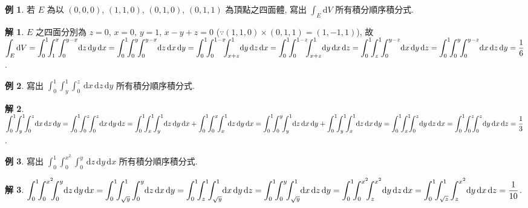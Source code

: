 \documentclass[12pt]{extarticle}
\newcommand{\ds}{\displaystyle}
\theoremstyle{definition}
\newtheorem*{ex}{例}
\newtheorem*{sol}{解}
\begin{document}
{\begin{ex}
  若 $E$ 為以 $(0, 0, 0)$, $(1, 1, 0)$, $(0, 1, 0)$, $(0, 1, 1)$ 為頂點之四面體, 寫出 $\ds\int_E\text{d}V$ 所有積分順序積分式.
\end{ex}

\begin{sol}
  $E$ 之四面分別為 $z = 0$, $x = 0$, $y = 1$, $x - y + z = 0$ ($\ds\because(1, 1, 0)\times(0, 1, 1) = (1, -1, 1)$), 故 \\$\ds\int_E\text{d}V = \int_0^1\!\!\int_1^{x}\!\!\int_0^{y - x}\!\!\,\text{d}z\,\text{d}y\,\text{d}x = \int_0^1\!\!\int_0^{y}\!\!\int_0^{y - x}\!\!\,\text{d}z\,\text{d}x\,\text{d}y = \int_0^1\!\!\int_0^{1 - x}\!\!\!\int_{x + z}^1\!\!\,\text{d}y\,\text{d}z\,\text{d}x = \int_0^1\!\!\int_0^{1 - z}\!\!\!\int_{x + z}^1\!\!\,\text{d}y\,\text{d}x\,\text{d}z \\ = \int_0^1\!\!\int_z^{1}\!\!\int_0^{y - z}\!\!\,\text{d}x\,\text{d}y\,\text{d}z = \int_0^1\!\!\int_0^{y}\!\!\int_0^{y - z}\!\!\,\text{d}x\,\text{d}z\,\text{d}y = \frac{1}{6}$.
\end{sol}

\begin{ex}
  寫出 $\ds\int_0^1\!\!\int_y^{1}\!\!\int_0^{z}\!\!\,\text{d}x\,\text{d}z\,\text{d}y$ 所有積分順序積分式.
\end{ex}

\begin{sol}
  $\ds\int_0^1\!\!\int_y^{1}\!\!\int_0^{z}\!\!\,\text{d}x\,\text{d}z\,\text{d}y = \int_0^1\!\!\int_0^z\!\!\int_0^z\!\!\,\text{d}x\,\text{d}y\,\text{d}z = \int_0^1\!\!\int_x^1\!\!\int_y^1\!\!\,\text{d}z\,\text{d}y\,\text{d}x + \int_0^1\!\!\int_0^{x}\!\!\int_x^1\!\!\,\text{d}z\,\text{d}y\,\text{d}x \\= \int_0^1\!\!\int_0^{y}\!\!\int_y^1\!\!\,\text{d}z\,\text{d}x\,\text{d}y + \int_0^1\!\!\int_y^1\!\!\int_x^{1}\!\!\,\text{d}z\,\text{d}x\,\text{d}y = \int_0^1\!\!\int_x^{1}\!\!\!\int_0^z\!\!\,\text{d}y\,\text{d}z\,\text{d}x = \int_0^1\!\!\int_0^z\!\!\!\int_0^z\!\!\,\text{d}y\,\text{d}x\,\text{d}z = \frac{1}{3}$.
\end{sol}

\begin{ex}
  寫出 $\ds\int_0^1\!\!\int_0^{x^2}\!\!\!\int_0^{y}\!\!\,\text{d}z\,\text{d}y\,\text{d}x$ 所有積分順序積分式.
\end{ex}

\begin{sol}
  $\ds\int_0^1\!\!\int_0^{x^2}\!\!\!\int_0^{y}\!\!\,\text{d}z\,\text{d}y\,\text{d}x = \int_0^1\!\!\int_{\sqrt{y}}^1\int_0^{y}\!\!\,\text{d}z\,\text{d}x\,\text{d}y = \int_0^1\!\!\int_z^1\!\!\int_{\sqrt{y}}^1\!\!\,\text{d}x\,\text{d}y\,\text{d}z = \int_0^1\!\!\int_0^y\!\!\int_{\sqrt{y}}^1\!\!\,\text{d}x\,\text{d}z\,\text{d}y = \int_0^1\!\!\int_0^{x^2}\!\!\!\int_z^{x^2}\!\!\,\text{d}y\,\text{d}z\,\text{d}x \\= \int_0^1\!\!\int_{\sqrt{z}}^1\int_z^{x^2}\!\!\,\text{d}y\,\text{d}x\,\text{d}z = \frac{1}{10}$.
\end{sol}

}
\end{document}
